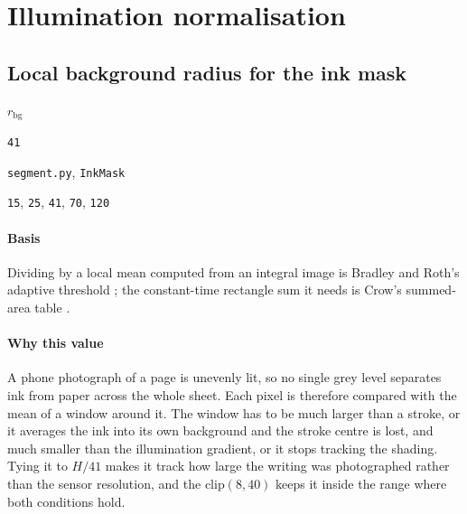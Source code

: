 \section{Illumination normalisation}

\subsection{Local background radius for the ink mask}

\label{coef:inkmask-bgradius}

\begin{description}[leftmargin=5.2em,style=sameline]

\item[Symbol] $r_{\text{bg}}$

\item[Value] \texttt{41}

\item[Source] \texttt{segment.py}, \texttt{InkMask}

\item[Swept] \texttt{15}, \texttt{25}, \texttt{41}, \texttt{70}, \texttt{120}

\end{description}

\paragraph{Basis}

Dividing by a local mean computed from an integral image is Bradley and Roth's adaptive threshold \cite{bradley2007}; the constant-time rectangle sum it needs is Crow's summed-area table \cite{crow1984}.

\paragraph{Why this value}

A phone photograph of a page is unevenly lit, so no single grey level separates ink from paper across the whole sheet. Each pixel is therefore compared with the mean of a window around it. The window has to be much larger than a stroke, or it averages the ink into its own background and the stroke centre is lost, and much smaller than the illumination gradient, or it stops tracking the shading. Tying it to $H/41$ makes it track how large the writing was photographed rather than the sensor resolution, and the $\mathrm{clip}(8,40)$ keeps it inside the range where both conditions hold.

